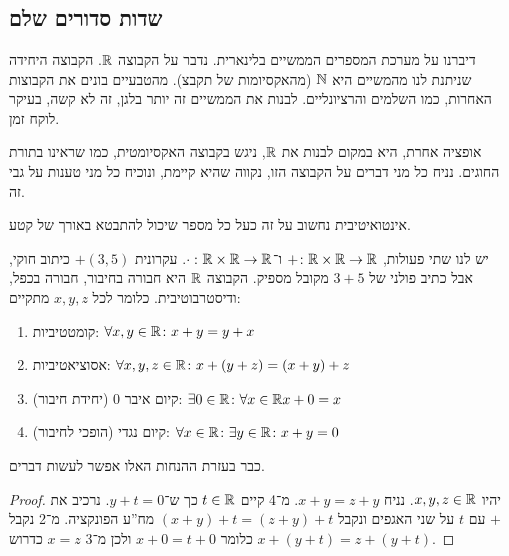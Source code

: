 \documentclass[name=רשימות חשבון דיפרנציאלי ואינטגרלי 1א]{../../../tex/classes/megasumPreamble}
\begin{document}
	
	
	\newpage

	\setcounter{tocdepth}{3} %
	\tableofcontents
	
	\newpage
	\section[הישר הממשי]{}
	\subsection{שדות סדורים שלם}
	דיברנו על מערכת המספרים הממשיים בלינארית. נדבר על הקבוצה $\mathbb{R}$. הקבוצה היחידה שניתנת לנו מהמשיים היא $\mathbb{N}$ (מהאקסיומות של תקבצ). מהטבעיים בונים את הקבוצות האחרות, כמו השלמים והרציונליים. לבנות את הממשיים זה יותר בלגן, זה לא קשה, בעיקר לוקח זמן.

	אופציה אחרת, היא במקום לבנות את $\mathbb{R}$, ניגש בקבוצה האקסיומטית, כמו שראינו בתורת החוגים. נניח כל מני דברים על הקבוצה הזו, נקווה שהיא קיימת, ונוכיח כל מני טענות על גבי זה.

	אינטואיטיבית נחשוב על זה כעל כל מספר שיכול להתבטא באורך של קטע.

	יש לנו שתי פעולות, $+ \colon \mathbb{R} \times \mathbb{R} \to \mathbb{R}$ ו־$\cdot \,\colon \mathbb{R} \times \mathbb{R} \to \mathbb{R}$. עקרונית $+(3, 5)$ כיתוב חוקי, אבל כתיב פולני של $3 + 5$ מקובל מספיק. הקבוצה $\mathbb{R}$ היא חבורה בחיבור, חבורה בכפל, ודיסטרבוטיבית. כלומר לכל $x, y, z$ מתקיים:
	\begin{enumerate}
		\item קומטטיביות: \hfill $\forall x, y \in \mathbb{R} \colon x + y = y + x$
		\item אסוציאטיביות: \hfill $\forall x, y, z \in \mathbb{R}\colon x + (y + z) = (x + y) + z$
		\item קיום איבר 0 (יחידת חיבור): \hfill $\exists 0 \in \mathbb{R}\colon \forall x \in \mathbb{R} x + 0 = x$
		\item קיום נגדי (הופכי לחיבור): \hfill $\forall x \in \mathbb{R} \colon \exists y \in \mathbb{R}\colon x + y = 0$
	\end{enumerate}
	כבר בעזרת ההנחות האלו אפשר לעשות דברים.
	\begin{proof}
		יהיו $x, y, z \in \mathbb{R}$. נניח $x+ y = z + y$. מ־4 קיים $t \in \mathbb{R}$ כך ש־$y + t = 0$. נרכיב את $+$ עם $t$ על שני האגפים ונקבל $(x + y) + t = (z + y) + t$ מח''ע הפונקציה. מ־2 נקבל $x + (y + t) = z + (y + t)$ כלומר $x + 0 = t + 0$ ולכן מ־3 $x = z$ כדרוש.
	\end{proof}
\end{document}
